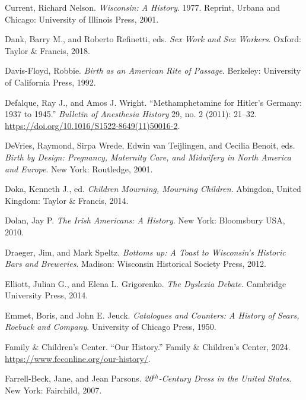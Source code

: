 \documentclass[
  letterpaper,
]{book}
\newlength{\cslhangindent}
\newenvironment{CSLReferences}[2] %
 {\begin{list}{}{%
  \setlength{\itemindent}{0pt}
  \setlength{\leftmargin}{0pt}
  \setlength{\parsep}{0pt}
  \ifodd #1
   \setlength{\leftmargin}{\cslhangindent}
   \setlength{\itemindent}{-1\cslhangindent}
  \fi
  \setlength{\itemsep}{#2\baselineskip}}}
 {\end{list}}
\begin{document}
\begin{CSLReferences}{1}{0}
Current, Richard Nelson. \emph{Wisconsin: A History}. 1977. Reprint,
{Urbana and Chicago}: University of Illinois Press, 2001.

Dank, Barry M., and Roberto Refinetti, eds. \emph{Sex Work and Sex
Workers}. Oxford: Taylor \& Francis, 2018.

Davis-Floyd, Robbie. \emph{Birth as an American Rite of Passage}.
Berkeley: University of California Press, 1992.

Defalque, Ray J., and Amos J. Wright. {``Methamphetamine for Hitler's
Germany: 1937 to 1945.''} \emph{Bulletin of Anesthesia History} 29, no.
2 (2011): 21--32. \url{https://doi.org/10.1016/S1522-8649(11)50016-2}.

DeVries, Raymond, Sirpa Wrede, Edwin van Teijlingen, and Cecilia Benoit,
eds. \emph{Birth by Design: Pregnancy, Maternity Care, and Midwifery in
North America and Europe}. New York: Routledge, 2001.

Doka, Kenneth J., ed. \emph{Children Mourning, Mourning Children}.
Abingdon, United Kingdom: Taylor \& Francis, 2014.

Dolan, Jay P. \emph{The Irish Americans: A History}. New York:
Bloomsbury USA, 2010.

Draeger, Jim, and Mark Speltz. \emph{Bottoms up: A Toast to Wisconsin's
Historic Bars and Breweries}. Madison: Wisconsin Historical Society
Press, 2012.

Elliott, Julian G., and Elena L. Grigorenko. \emph{The Dyslexia Debate}.
Cambridge University Press, 2014.

Emmet, Boris, and John E. Jeuck. \emph{Catalogues and Counters: A
History of Sears, Roebuck and Company}. University of Chicago Press,
1950.

Family \& Children's Center. {``Our History.''} Family \& Children's
Center, 2024. \url{https://www.fcconline.org/our-history/}.

Farrell-Beck, Jane, and Jean Parsons. \emph{{20\(^{th}\)-Century} Dress
in the United States}. New York: Fairchild, 2007.


\end{CSLReferences}
\end{document}
